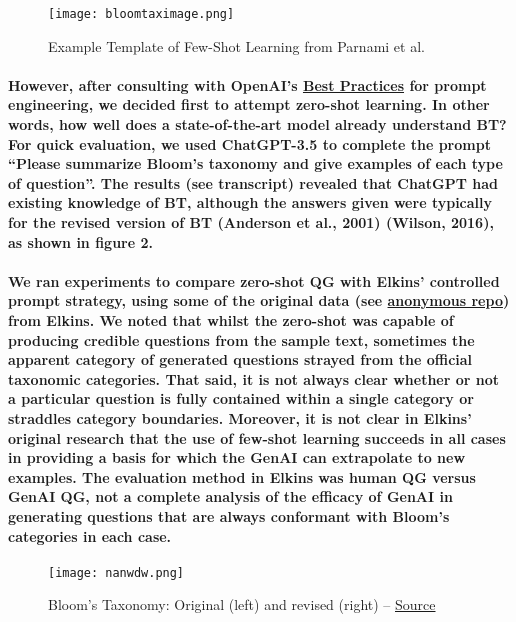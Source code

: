 \documentclass{article}
\begin{document}
\begin{figure}[h!tbp]
    \centering
    \texttt{[image: bloomtaximage.png]}
    \caption{Example Template of Few-Shot Learning from Parnami et al.}
    \label{fig:1}
\end{figure}

\paragraph{However, after consulting with OpenAI’s \href{https://help.openai.com/en/articles/6654000-best-practices-for-prompt-engineering-with-openai-api}{Best Practices} for prompt engineering, we decided first to attempt zero-shot learning. In other words, how well does a state-of-the-art model already understand BT? For quick evaluation, we used ChatGPT-3.5 to complete the prompt “Please summarize Bloom's taxonomy and give examples of each type of question”. The results (see transcript) revealed that ChatGPT had existing knowledge of BT, although the answers given were typically for the revised version of BT (Anderson et al., 2001) (Wilson, 2016), as shown in figure 2.}

\paragraph{We ran experiments to compare zero-shot QG with Elkins’ controlled prompt strategy, using some of the original data (see \href{https://anonymous.4open.science/r/EQG_in_practice-2752/raw_data/few_shot_examples_ML.csv}{anonymous repo}) from Elkins. We noted that whilst the zero-shot was capable of producing credible questions from the sample text, sometimes the apparent category of generated questions strayed from the official taxonomic categories. That said, it is not always clear whether or not a particular question is fully contained within a single category or straddles category boundaries. Moreover, it is not clear in Elkins’ original research that the use of few-shot learning succeeds in all cases in providing a basis for which the GenAI can extrapolate to new examples. The evaluation method in Elkins was human QG versus GenAI QG, not a complete analysis of the efficacy of GenAI in generating questions that are always conformant with Bloom’s categories in each case.}

\begin{figure}[h!tbp]
    \centering
    \texttt{[image: nanwdw.png]}
    \caption{Bloom's Taxonomy: Original (left) and revised (right) -- \href{https://joanakompa.com/2017/02/07/why-it-is-time-to-retire-blooms-taxonomy/}{Source}}
    \label{fig:2}
\end{figure}
\end{document}
